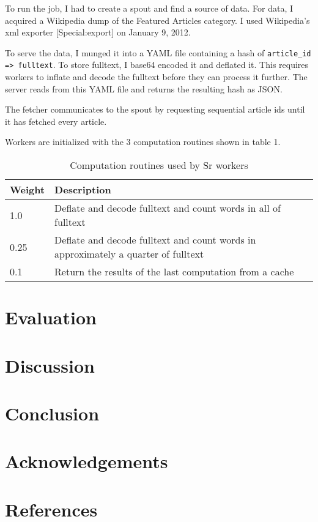 \documentclass[12pt]{article}
\begin{document}
To run the job, I had to create a spout and find a source of data. For data, I acquired a Wikipedia dump of the Featured Articles category. I used Wikipedia’s xml exporter [Special:export] on January 9, 2012.

To serve the data, I munged it into a YAML file containing a hash of \texttt{article\_id => fulltext}. To store fulltext, I base64 encoded it and deflated it. This requires workers to inflate and decode the fulltext before they can process it further. The server reads from this YAML file and returns the resulting hash as JSON.

The fetcher communicates to the spout by requesting sequential article ids until it has fetched every article.

Workers are initialized with the 3 computation routines shown in table 1.

\begin{center}
\begin{table}
\begin{tabular}{|l|p{5cm}|}
 \hline
Weight & Description \\ \hline
1.0 & Deflate and decode fulltext and count words in all of fulltext \\ \hline
0.25 & Deflate and decode fulltext and count words in approximately a quarter of fulltext \\ \hline
0.1 & Return the results of the last computation from a cache \\ \hline
\end{tabular}
\caption{Computation routines used by Sr workers}
\end{table}
\end{center}

\section{Evaluation}

\section{Discussion}

\section{Conclusion}

\section{Acknowledgements}

\section{References}
\end{document}
